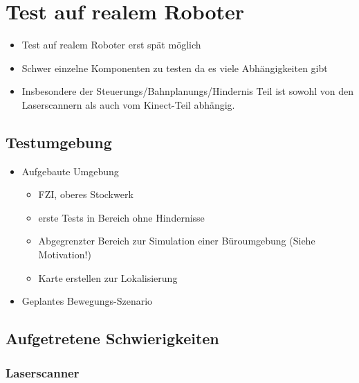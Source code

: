 
\chapter{Test auf realem Roboter}
\authorsection{\editortobias}

\begin{itemize}
	\item Test auf realem Roboter erst spät möglich
	\item Schwer einzelne Komponenten zu testen da es viele Abhängigkeiten gibt
	\item Insbesondere der Steuerungs/Bahnplanungs/Hindernis Teil ist sowohl von den Laserscannern als auch vom Kinect-Teil abhängig.
\end{itemize}


\section{Testumgebung}
\authorsection{\editortobias}

\begin{itemize}
	\item Aufgebaute Umgebung
	\begin{itemize}
		\item FZI, oberes Stockwerk
		\item erste Tests in Bereich ohne Hindernisse
		\item Abgegrenzter Bereich zur Simulation einer Büroumgebung (Siehe Motivation!)
		\item Karte erstellen zur Lokalisierung
	\end{itemize}
	\item Geplantes Bewegungs-Szenario
\end{itemize}


\section{Aufgetretene Schwierigkeiten}
\authorsection{\editorjulian}

\subsection{Laserscanner}


